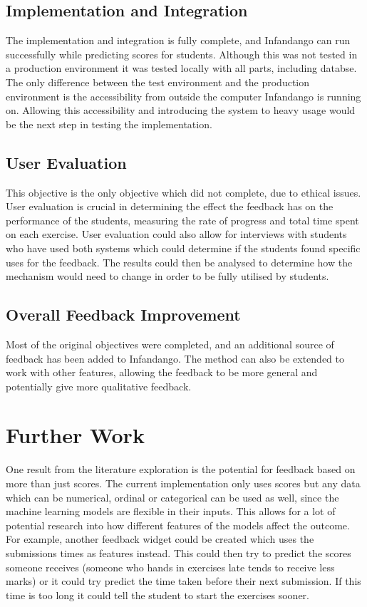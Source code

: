 \subsection{Implementation and Integration}
The implementation and integration is fully complete, and Infandango can run successfully while predicting scores for students. Although this was not tested in a production environment it was tested locally with all parts, including databse. The only difference between the test environment and the production environment is the accessibility from outside the computer Infandango is running on. Allowing this accessibility and introducing the system to heavy usage would be the next step in testing the implementation.

\subsection{User Evaluation}
This objective is the only objective which did not complete, due to ethical issues. User evaluation is crucial in determining the effect the feedback has on the performance of the students, measuring the rate of progress and total time spent on each exercise. User evaluation could also allow for interviews with students who have used both systems which could determine if the students found specific uses for the feedback. The results could then be analysed to determine how the mechanism would need to change in order to be fully utilised by students.

\subsection{Overall Feedback Improvement}
Most of the original objectives were completed, and an additional source of feedback has been added to Infandango. The method can also be extended to work with other features, allowing the feedback to be more general and potentially give more qualitative feedback. 

\section{Further Work}
One result from the literature exploration is the potential for feedback based on more than just scores. The current implementation only uses scores but any data which can be numerical, ordinal or categorical can be used as well, since the machine learning models are flexible in their inputs. This allows for a lot of potential research into how different features of the models affect the outcome. For example, another feedback widget could be created which uses the submissions times as features instead. This could then try to predict the scores someone receives (someone who hands in exercises late tends to receive less marks) or it could try predict the time taken before their next submission. If this time is too long it could tell the student to start the exercises sooner.

